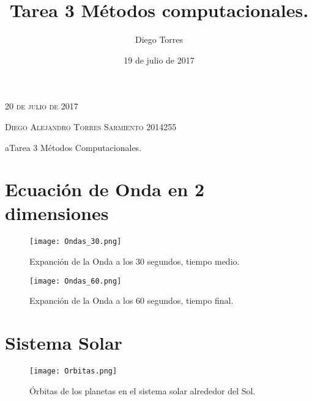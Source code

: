 \documentclass{article}
\author{Diego Torres}
\date{19 de julio de 2017}
\title{Tarea 3 Métodos computacionales.}
\newcommand{\JournalIssue}[1]{%
		\hfill \textsc{20 de julio de 2017}
		\par \normalsize \normalfont}
\newcommand{\JournalName}[1]{%
		\begin{center}	
			\Huge \usefont{T1}{m}{n}
			#1%
		\end{center}	
		\par \normalsize \normalfont}
\newcommand{\NewsAuthor}[1]{%
  \hfill \textsc{Diego Alejandro Torres Sarmiento 2014255}
  \par \normalsize \normalfont}
\begin{document}
\JournalIssue{1}
\NewsAuthor{}
\JournalName{aTarea 3 Métodos Computacionales.}

\section{Ecuación de Onda en 2 dimensiones}

\begin{figure}[h!]
\centering
\texttt{[image: Ondas\_30.png]}
\caption{Expanción de la Onda a los 30 segundos, tiempo medio.}
\end{figure}

\begin{figure}[h!]
\centering
\texttt{[image: Ondas\_60.png]}
\caption{Expanción de la Onda a los 60 segundos, tiempo final.}
\end{figure}

\section{Sistema Solar}

\begin{figure}[h!]
\centering
\texttt{[image: Orbitas.png]}
\caption{Órbitas de los planetas en el sistema solar alrededor del Sol.}
\end{figure}
\end{document}
